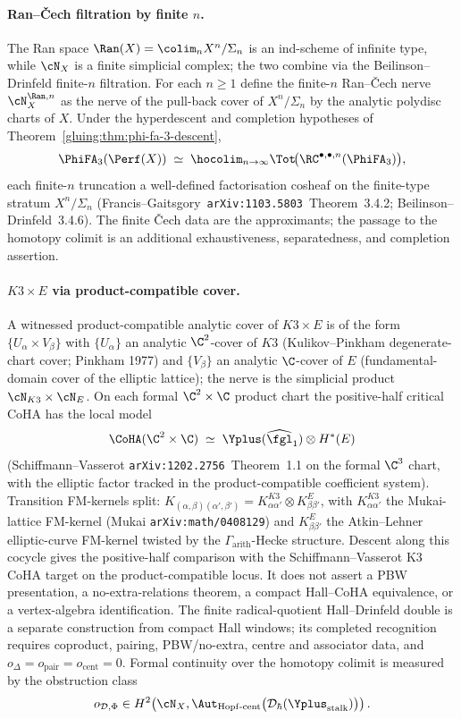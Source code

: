 \paragraph{Ran--\v{C}ech filtration by finite $n$.} The Ran space
$\Ran(X)=\colim_{n}X^{n}/\Sigma_{n}$ is an ind-scheme of infinite
type, while $\cN_{X}$ is a finite simplicial complex; the two combine
via the Beilinson--Drinfeld finite-$n$ filtration. For each $n\geq 1$
define the finite-$n$ Ran--\v{C}ech nerve $\cN_{X}^{\Ran,n}$ as the
nerve of the pull-back cover of $X^{n}/\Sigma_{n}$ by the
analytic polydisc charts of $X$. Under the hyperdescent and completion
hypotheses of Theorem~\ref{gluing:thm:phi-fa-3-descent},
\[
\PhiFA_{3}(\Perf(X))\;\simeq\;
\hocolim_{n\to\infty}
\Tot\!\bigl(\RC^{\bullet,\bullet,n}(\PhiFA_{3})\bigr),
\]
each finite-$n$ truncation a well-defined factorisation cosheaf on
the finite-type stratum $X^{n}/\Sigma_{n}$
(Francis--Gaitsgory~\texttt{arXiv:1103.5803}~Theorem~3.4.2;
Beilinson--Drinfeld~3.4.6). The finite \v{C}ech data are the
approximants; the passage to the homotopy colimit is an additional
exhaustiveness, separatedness, and completion assertion.

\paragraph{$K3\times E$ via product-compatible cover.} A witnessed
product-compatible analytic cover of $K3\times E$ is of the form
$\{U_{\alpha}\times V_{\beta}\}$ with $\{U_{\alpha}\}$ an analytic
$\C^{2}$-cover of $K3$ (Kulikov--Pinkham degenerate-chart cover;
Pinkham 1977) and $\{V_{\beta}\}$ an analytic $\C$-cover of $E$
(fundamental-domain cover of the elliptic lattice); the nerve is the
simplicial product $\cN_{K3}\times\cN_{E}$. On each formal
$\C^{2}\times\C$ product chart the positive-half critical CoHA has the
local model
\[
\CoHA(\C^{2}\times\C)\;\simeq\;
\Yplus(\widehat{\fgl}_{1})\otimes H^{\ast}(E)
\]
(Schiffmann--Vasserot \texttt{arXiv:1202.2756}~Theorem~1.1 on the
formal $\C^3$ chart, with the elliptic factor tracked in the
product-compatible coefficient system). Transition FM-kernels split:
$K_{(\alpha,\beta)(\alpha',\beta')}=K^{K3}_{\alpha\alpha'}\otimes
K^{E}_{\beta\beta'}$, with $K^{K3}_{\alpha\alpha'}$ the Mukai-lattice
FM-kernel (Mukai \texttt{arXiv:math/0408129}) and
$K^{E}_{\beta\beta'}$ the Atkin--Lehner elliptic-curve FM-kernel
twisted by the $\Gamma_{\mathrm{arith}}$-Hecke structure. Descent along
this cocycle gives the positive-half comparison with the
Schiffmann--Vasserot K3 CoHA target on the product-compatible locus. It
does not assert a PBW presentation, a no-extra-relations theorem, a
compact Hall--CoHA equivalence, or a vertex-algebra identification. The
finite radical-quotient Hall--Drinfeld double is a separate
construction from compact Hall windows; its completed recognition
requires coproduct, pairing, PBW/no-extra, centre and associator data,
and $o_\Delta=o_{\mathrm{pair}}=o_{\mathrm{cent}}=0$. Formal continuity
over the homotopy colimit is measured
by the obstruction class
\[
 o_{\mathcal D,\Phi}\in
 H^2\!\left(\cN_X,
 \Aut_{\mathrm{Hopf}\text{-}\mathrm{cent}}
 \bigl(\mathcal D_\hbar(\Yplus_{\mathrm{stalk}})\bigr)\right).
\]


